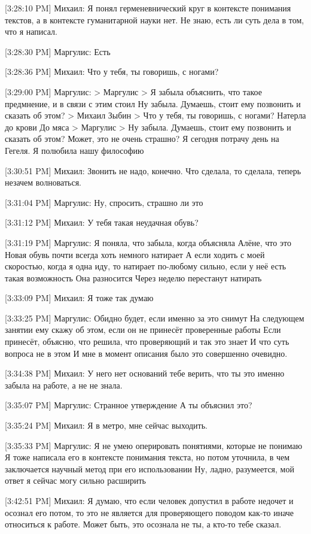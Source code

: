 \documentclass{article}
\begin{document}
[3:28:10 PM] Михаил:
Я понял герменевнический круг в контексте понимания текстов, а в контексте гуманитарной науки нет. Не знаю, есть ли суть дела в том, что я написал.

[3:28:30 PM] Маргулис:
Есть

[3:28:36 PM] Михаил:
Что у тебя, ты говоришь, с ногами?

[3:29:00 PM] Маргулис:
> Маргулис
> Я забыла объяснить, что такое предмнение, и в связи с этим стоил
Ну забыла. Думаешь, стоит ему позвонить и сказать об этом?
> Михаил Зыбин
> Что у тебя, ты говоришь, с ногами?
Натерла до крови
 До мяса
> Маргулис
> Ну забыла. Думаешь, стоит ему позвонить и сказать об этом?
Может, это не очень страшно?
 Я сегодня потрачу день на Гегеля. Я полюбила нашу философию

[3:30:51 PM] Михаил:
Звонить не надо, конечно. Что сделала, то сделала, теперь незачем волноваться.

[3:31:04 PM] Маргулис:
Ну, спросить, страшно ли это

[3:31:12 PM] Михаил:
У тебя такая неудачная обувь?

[3:31:19 PM] Маргулис:
Я поняла, что забыла, когда объясняла Алёне, что это
 Новая обувь почти всегда хоть немного натирает
 А если ходить с моей скоростью, когда я одна иду, то натирает по-любому сильно, если у неё есть такая возможность
 Она разносится
 Через неделю перестанут натирать

[3:33:09 PM] Михаил:
Я тоже так думаю

[3:33:25 PM] Маргулис:
Обидно будет, если именно за это снимут
 На следующем занятии ему скажу об этом, если он не принесёт проверенные работы
 Если принесёт, объясню, что решила, что проверяющий и так это знает
 И что суть вопроса не в этом
 И мне в момент описания было это совершенно очевидно.

[3:34:38 PM] Михаил:
У него нет оснований тебе верить, что ты это именно забыла на работе, а не не знала.

[3:35:07 PM] Маргулис:
Странное утверждение
 А ты объяснил это?

[3:35:24 PM] Михаил:
Я в метро, мне сейчас выходить.

[3:35:33 PM] Маргулис:
Я не умею оперировать понятиями, которые не понимаю
 Я тоже написала его в контексте понимания текста, но потом уточнила, в чем заключается научный метод при его использовании
 Ну, ладно, разумеется, мой ответ я сейчас могу сильно расширить

[3:42:51 PM] Михаил:
Я думаю, что если человек допустил в работе недочет и осознал его потом, то это не является для проверяющего поводом как-то иначе относиться к работе.
 Может быть, это осознала не ты, а кто-то тебе сказал.
\end{document}
